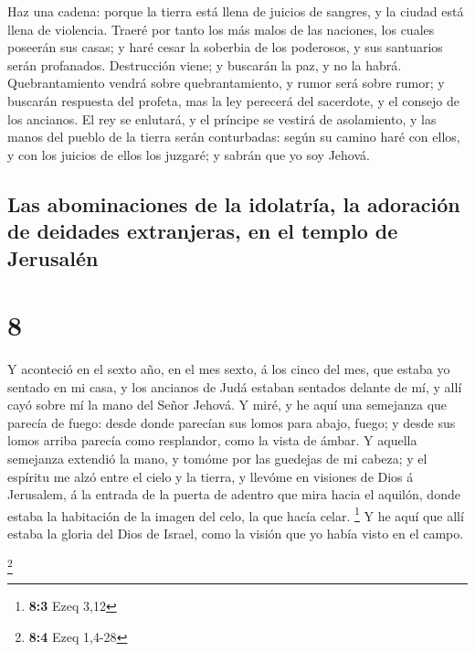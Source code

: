  Haz una cadena: porque la tierra está llena de juicios de
sangres, y la ciudad está llena de violencia.  Traeré por
tanto los más malos de las naciones, los cuales poseerán sus casas; y
haré cesar la soberbia de los poderosos, y sus santuarios serán
profanados.  Destrucción viene; y buscarán la paz, y no la
habrá.  Quebrantamiento vendrá sobre quebrantamiento, y
rumor será sobre rumor; y buscarán respuesta del profeta, mas la ley
perecerá del sacerdote, y el consejo de los ancianos.  El
rey se enlutará, y el príncipe se vestirá de asolamiento, y las manos
del pueblo de la tierra serán conturbadas: según su camino haré con
ellos, y con los juicios de ellos los juzgaré; y sabrán que yo soy
Jehová.

\hypertarget{las-abominaciones-de-la-idolatruxeda-la-adoraciuxf3n-de-deidades-extranjeras-en-el-templo-de-jerusaluxe9n}{%
\subsection{Las abominaciones de la idolatría, la adoración de deidades
extranjeras, en el templo de
Jerusalén}\label{las-abominaciones-de-la-idolatruxeda-la-adoraciuxf3n-de-deidades-extranjeras-en-el-templo-de-jerusaluxe9n}}

\hypertarget{section-7}{%
\section{8}\label{section-7}}

 Y aconteció en el sexto año, en el mes sexto, á los cinco
del mes, que estaba yo sentado en mi casa, y los ancianos de Judá
estaban sentados delante de mí, y allí cayó sobre mí la mano del Señor
Jehová.  Y miré, y he aquí una semejanza que parecía de
fuego: desde donde parecían sus lomos para abajo, fuego; y desde sus
lomos arriba parecía como resplandor, como la vista de ámbar.
 Y aquella semejanza extendió la mano, y tomóme por las
guedejas de mi cabeza; y el espíritu me alzó entre el cielo y la tierra,
y llevóme en visiones de Dios á Jerusalem, á la entrada de la puerta de
adentro que mira hacia el aquilón, donde estaba la habitación de la
imagen del celo, la que hacía celar. \footnote{\textbf{8:3} Ezeq 3,12}
 Y he aquí que allí estaba la gloria del Dios de Israel,
como la visión que yo había visto en el campo.

\footnote{\textbf{8:4} Ezeq 1,4-28}

